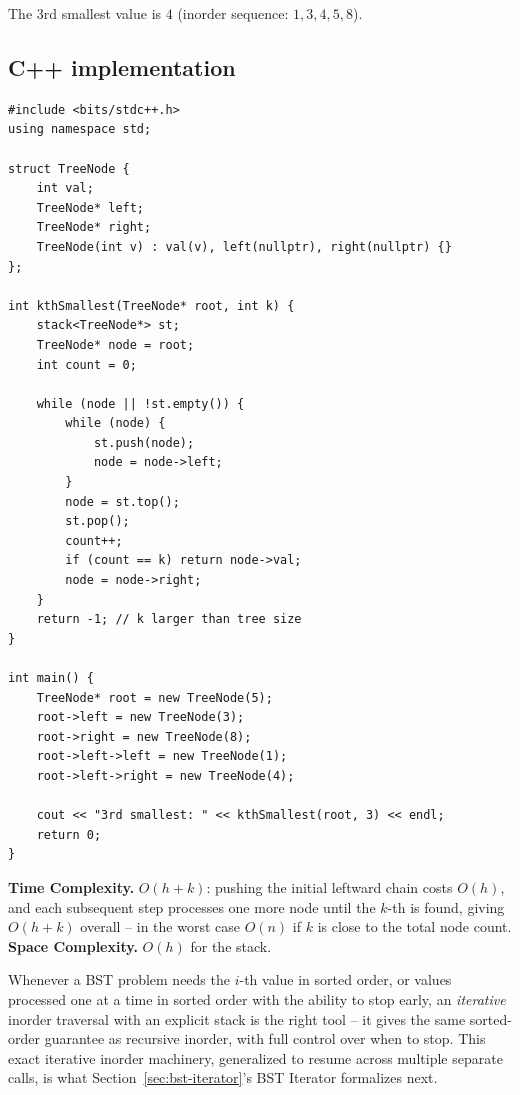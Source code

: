 The $3$rd smallest value is $4$ (inorder sequence: $1,3,4,5,8$).

\subsection*{C++ implementation}

\begin{lstlisting}
#include <bits/stdc++.h>
using namespace std;

struct TreeNode {
    int val;
    TreeNode* left;
    TreeNode* right;
    TreeNode(int v) : val(v), left(nullptr), right(nullptr) {}
};

int kthSmallest(TreeNode* root, int k) {
    stack<TreeNode*> st;
    TreeNode* node = root;
    int count = 0;

    while (node || !st.empty()) {
        while (node) {
            st.push(node);
            node = node->left;
        }
        node = st.top();
        st.pop();
        count++;
        if (count == k) return node->val;
        node = node->right;
    }
    return -1; // k larger than tree size
}

int main() {
    TreeNode* root = new TreeNode(5);
    root->left = new TreeNode(3);
    root->right = new TreeNode(8);
    root->left->left = new TreeNode(1);
    root->left->right = new TreeNode(4);

    cout << "3rd smallest: " << kthSmallest(root, 3) << endl;
    return 0;
}
\end{lstlisting}

\begin{complexitybox}
\textbf{Time Complexity.} $O(h+k)$: pushing the initial leftward chain
costs $O(h)$, and each subsequent step processes one more node until the
$k$-th is found, giving $O(h+k)$ overall -- in the worst case $O(n)$ if
$k$ is close to the total node count.
\textbf{Space Complexity.} $O(h)$ for the stack.
\end{complexitybox}

\begin{takeawaybox}
Whenever a BST problem needs the $i$-th value in sorted order, or values
processed one at a time in sorted order with the ability to stop early,
an \emph{iterative} inorder traversal with an explicit stack is the right
tool -- it gives the same sorted-order guarantee as recursive inorder,
with full control over when to stop. This exact iterative inorder
machinery, generalized to resume across multiple separate calls, is what
Section~\ref{sec:bst-iterator}'s BST Iterator formalizes next.
\end{takeawaybox}
